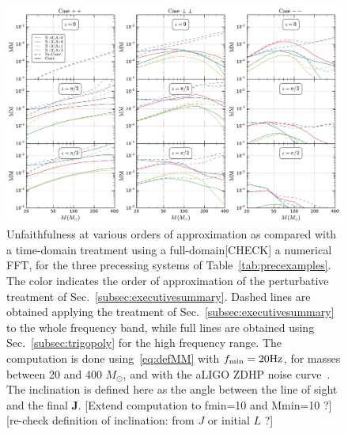 \documentclass[aps,showpacs,twocolumn,
prd,superscriptaddress,nofootinbib]{revtex4-1}
\newcommand{\Msol}{M_{\odot}}
\newcommand{\SM}[1]{{\color{Red} #1}}
\newcommand{\jgb}[1]{{\color{DarkGreen} #1}}
\begin{document}
\begin{figure}
  \centering
  \includegraphics[width=.98\linewidth]{plots/precMM_py.pdf}
  \caption{Unfaithfulness at various orders of approximation \jgb{as compared with a time-domain treatment using a full-domain[CHECK]} a numerical FFT, for the three precessing systems of Table~\ref{tab:precexamples}. The color indicates the order of approximation of the perturbative treatment of Sec.~\ref{subsec:executivesummary}. Dashed lines are obtained applying the treatment of Sec.~\ref{subsec:executivesummary} to the whole frequency band, while full lines are obtained using Sec.~\ref{subsec:trigopoly} for the high frequency range. The computation is done using~\eqref{eq:defMM} with $f_{\rm min} = 20\mathrm{Hz}$, for masses between 20 and 400 $\Msol$, and with the aLIGO ZDHP noise curve~\cite{LIGOProspects13}. The inclination is defined here as the angle between the line of sight and the final $\bm{J}$. \SM{[Extend computation to fmin=10 and Mmin=10 ?]} \SM{[re-check definition of inclination: from $J$ or initial $L$ ?]} }
  \label{fig:precunfaithfulness}
\end{figure}
\end{document}
